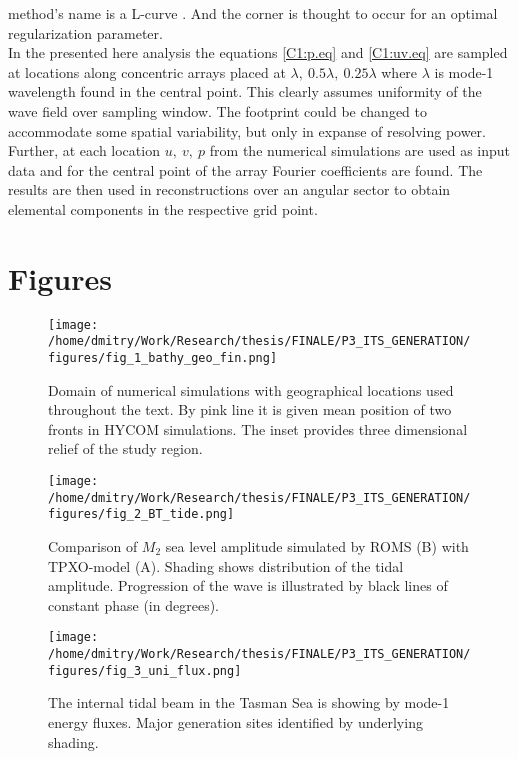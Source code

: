 \documentclass[12pt]{article}
\newcommand{\SCALET}{1.25}
\begin{document}
method's name is a L-curve \citep{hansen1999curve}. And the corner is thought to occur for an 
optimal regularization parameter.\\
In the presented here analysis the equations \eqref{C1:p.eq} and \eqref{C1:uv.eq} are sampled at locations along concentric 
arrays placed at $\lambda,~0.5\lambda,~0.25\lambda$ where $\lambda$ is mode-1 wavelength found in 
the central point. This clearly assumes uniformity of the wave field over sampling window. The 
footprint could be changed to accommodate some spatial variability, but only in expanse of 
resolving power. Further, at each location $u,~v,~p$ from the numerical simulations are used as 
input data and for the central point of the array Fourier coefficients are found. The results are 
then used in reconstructions over an angular sector to obtain elemental components in the 
respective grid point.

\newpage
\section{Figures}

\begin{figure}
	\centering
	\texttt{[image: /home/dmitry/Work/Research/thesis/FINALE/P3\_ITS\_GENERATION/figures/fig\_1\_bathy\_geo\_fin.png]}
	\caption{Domain of numerical simulations with geographical locations used throughout the text. 
	By pink line it is given mean position of two fronts in HYCOM simulations. The inset provides 
	three dimensional relief of the study region.}
	\label{C3.fig:geo.map}
\end{figure}

\begin{figure}
	\centering
	\texttt{[image: /home/dmitry/Work/Research/thesis/FINALE/P3\_ITS\_GENERATION/figures/fig\_2\_BT\_tide.png]}
	\caption{Comparison of $M_2$ sea level amplitude simulated by ROMS (B) with 
	TPXO-model (A). Shading shows distribution of the tidal amplitude. Progression of the wave is 
	illustrated by black lines of constant phase (in degrees).}
	\label{C3.fig:BT}
\end{figure}

\begin{figure}
	\centering
	\texttt{[image: /home/dmitry/Work/Research/thesis/FINALE/P3\_ITS\_GENERATION/figures/fig\_3\_uni\_flux.png]}
	\caption{The internal tidal beam in the Tasman Sea is showing by mode-1 energy fluxes. Major 
	generation sites identified by underlying shading.}
	\label{C3.fig:beam}
\end{figure}
\end{document}
